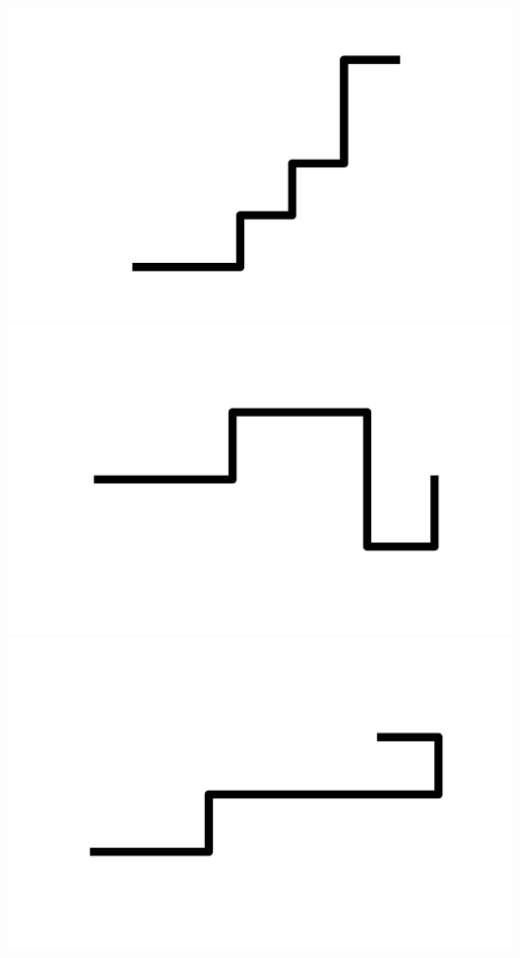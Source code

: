 \documentclass[]{report}
\begin{document}
\includegraphics[scale=.1]{pictures/21/state_cluster_shapes_223.pdf} 
\includegraphics[scale=.1]{pictures/21/state_cluster_shapes_224.pdf} 
\includegraphics[scale=.1]{pictures/21/state_cluster_shapes_225.pdf} 
\end{document}

